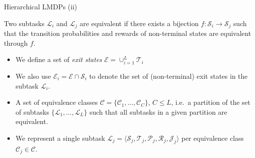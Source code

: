 \documentclass{beamer}
\theoremstyle{mystyle}
\newcommand{\cC}{\mathcal{C}}
\newcommand{\cE}{\mathcal{E}}
\newcommand{\cJ}{\mathcal{J}}
\newcommand{\cL}{\mathcal{L}}
\newcommand{\cP}{\mathcal{P}}
\newcommand{\cR}{\mathcal{R}}
\newcommand{\cS}{\mathcal{S}}
\newcommand{\cT}{\mathcal{T}}
\begin{document}
\begin{frame}{Hierarchical LMDPs (ii)}

\begin{definition}
Two subtasks $\cL_i$ and $\cL_j$ are equivalent if there exists a bijection $f:\cS_i\rightarrow\cS_j$ such that the transition probabilities and rewards of non-terminal states are equivalent through $f$.
\end{definition}

\begin{itemize}
    
     
    \item We define a set of {\em exit states} $\cE=\cup_{i=1}^L\cT_i$
    \item We also use $\cE_i=\cE\cap\cS_i$ to denote the set of (non-terminal) exit states in the subtask $\cL_i$. 
    
    \item  A set of equivalence classes $\cC=\{\cC_1,\ldots,\cC_C\}$, $C\leq L$, i.e.~a partition of the set of subtasks $\{\cL_1,\ldots,\cL_L\}$ such that all subtasks in a given partition are equivalent.
    
    \item We represent a single subtask $\cL_j=\langle\cS_j,\cT_j,\cP_j,\cR_j,\cJ_j\rangle$ per equivalence class $\cC_j\in\cC$. 
    
\end{itemize}

    
\end{frame}
\end{document}

